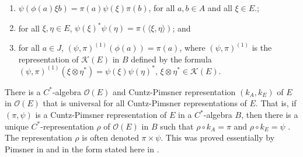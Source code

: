 \documentclass{amsproc}
\theoremstyle{plain}
\theoremstyle{definition}
\theoremstyle{definition}
\theoremstyle{remark}
\theoremstyle{plain}
\begin{document}
\begin{enumerate}
\item $\psi(\phi(a)\xi b)=\pi(a)\psi(\xi)\pi(b)$, for all $a,b\in A$ and
all $\xi\in E.$;
\item for all $\xi,\eta\in E$,
$\psi(\xi)^{*}\psi(\eta)=\pi(\langle\xi,\eta\rangle)$;
and
\item for all $a\in J$, $(\psi,\pi)^{(1)}(\phi(a))=\pi(a)$, where
$(\psi,\pi)^{(1)}$
is the representation of $\mathcal{K}(E)$ in $B$ defined by the
formula $(\psi,\pi)^{(1)}(\xi\otimes\eta^{*})=\psi(\xi)\psi(\eta)^{*}$,
$\xi\otimes\eta^{*}\in\mathcal{K}(E)$. 
\end{enumerate}
There is a $C^{*}$-algebra $\mathcal{O}(E)$ and Cuntz-Pimsner representation
$(k_{A},k_{E})$ of $E$ in $\mathcal{O}(E)$ that is universal for
all Cuntz-Pimsner representations of $E$. That is, if $(\pi,\psi)$
is a Cuntz-Pimsner representation of $E$ in a $C^{*}$-algebra $B$,
then there is a unique $C^{*}$-representation $\rho$ of $\mathcal{O}(E)$
in $B$ such that $\rho\circ k_{A}=\pi$ and $\rho\circ k_{E}=\psi$
. The representation $\rho$ is often denoted $\pi\times\psi$. This
was proved essentially by Pimsner in \cite{mP97} and in the form
stated here in \cite[Proposition 1.3]{FMR03}. 
\end{document}
